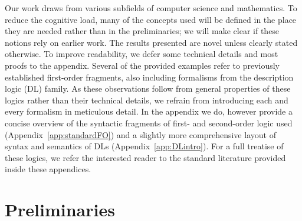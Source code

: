 Our work draws from various subfields of computer science and mathematics. To reduce the cognitive load, many of the concepts used will be defined in the place they are needed rather than in the preliminaries; we will make clear if these notions rely on earlier work. The results presented are novel unless clearly stated otherwise.
To improve readability, we defer some technical details and most proofs to the appendix.
Several of the provided examples refer to previously established first-order fragments, also including formalisms from the description logic (DL) family. As these observations follow from general properties of these logics rather than their technical details, we refrain from introducing each and every formalism in meticulous detail. In the appendix we do, however provide a concise overview of the syntactic fragments of first- and second-order logic used (Appendix~\ref{app:standardFO}) and a slightly more comprehensive layout of syntax and semantics of DLs (Appendix~\ref{app:DLintro}).   
For a full treatise of these logics, we refer the interested reader to the standard literature provided inside these appendices.

\section{Preliminaries}\label{sec:preliminaries}

\newcommand{\shuffle}[1]{\concat_{#1}}


